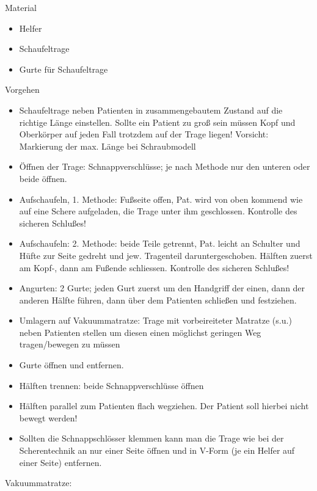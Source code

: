 \documentclass{article}
\begin{document}
{\mdseries\color{black}
Material}

\begin{itemize}
\item { Helfer}

\item {\mdseries
Schaufeltrage}

\item {\mdseries
Gurte f\"ur Schaufeltrage}

\end{itemize}
{\mdseries\color{black}
Vorgehen}

\begin{itemize}
\item {\mdseries
Schaufeltrage neben Patienten in zusammengebautem Zustand auf die
richtige L\"ange einstellen. Sollte ein Patient zu gro{\ss} sein
m\"ussen Kopf und Oberk\"orper auf jeden Fall trotzdem auf der Trage
liegen! Vorsicht: Markierung der max. L\"ange bei Schraubmodell}

\item {\mdseries
\"Offnen der Trage: Schnappverschl\"usse; je nach Methode nur den
unteren oder beide \"offnen.}

\item {\mdseries
Aufschaufeln, 1. Methode: Fu{\ss}seite offen, Pat. wird von oben kommend
wie auf eine Schere aufgeladen, die Trage unter ihm geschlossen.
Kontrolle des sicheren Schlu{\ss}es!}

\item {\mdseries
Aufschaufeln: 2. Methode: beide Teile getrennt, Pat. leicht an Schulter
und H\"ufte zur Seite gedreht und jew. Tragenteil daruntergeschoben.
H\"alften zuerst am Kopf-, dann am Fu{\ss}ende schliessen. Kontrolle
des sicheren Schlu{\ss}es!}

\item {\mdseries
Angurten: 2 Gurte; jeden Gurt zuerst um den Handgriff der einen, dann
der anderen H\"alfte f\"uhren, dann \"uber dem Patienten schlie{\ss}en
und festziehen.}

\item {\mdseries
Umlagern auf Vakuummatratze: Trage mit vorbeireiteter Matratze (s.u.)
neben Patienten stellen um diesen einen m\"oglichst geringen Weg
tragen/bewegen zu m\"ussen}

\item {\mdseries
Gurte \"offnen und entfernen.}

\item {\mdseries
H\"alften trennen: beide Schnappverschl\"usse \"offnen}

\item {\mdseries
H\"alften parallel zum Patienten flach wegziehen. Der Patient soll
hierbei nicht bewegt werden!}

\item {\mdseries
Sollten die Schnappschl\"osser klemmen kann man die Trage wie bei der
Scherentechnik an nur einer Seite \"offnen und in V-Form (je ein Helfer
auf einer Seite) entfernen.}

\end{itemize}
{\mdseries\color[rgb]{0.0,0.0,0.5019608}
Vakuummatratze:}
\end{document}
